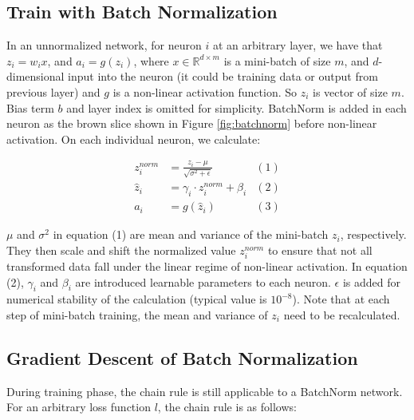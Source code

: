 \documentclass{article}
\begin{document}
\subsection{Train with Batch Normalization}
In an unnormalized network, for neuron $i$ at an arbitrary layer, we have that $z_i=w_ix$, and $a_i=g(z_i)$, where $x\in\mathbb{R}^{d\times m}$ is a mini-batch of size $m$, and  $d$-dimensional input into the neuron (it could be training data or output from previous layer) and $g$ is a non-linear activation function. So $z_i$ is vector of size $m$. Bias term $b$ and layer index is omitted for simplicity. BatchNorm is added in each neuron as the brown slice shown in Figure \ref{fig:batchnorm} before non-linear activation. On each individual neuron, we calculate:

\begin{align*}
    z_i^{norm}& = \frac{z_i-\mu}{\sqrt{\sigma^2+\epsilon}}  &(1)\\
    \hat{z}_i&= \gamma_i\cdot z_i^{norm}+\beta_i  &(2)\\
    a_i&=g(\hat{z}_i) &(3)
\end{align*}

$\mu$ and $\sigma^2$ in equation (1) are mean and variance of the mini-batch $z_i$, respectively. They then scale and shift the normalized value $z_i^{norm}$ to ensure that not all transformed data fall under the linear regime of non-linear activation. In equation (2), $\gamma_i$ and $\beta_i$ are introduced learnable parameters to each neuron.  $\epsilon$ is added for numerical stability of the calculation (typical value is $10^{-8}$). Note that at each step of mini-batch training, the mean and variance of $z_i$ need to be recalculated.

\subsection{Gradient Descent of Batch Normalization}

During training phase, the chain rule is still applicable to a BatchNorm network. For an arbitrary loss function $l$, the chain rule is as follows:
\end{document}
